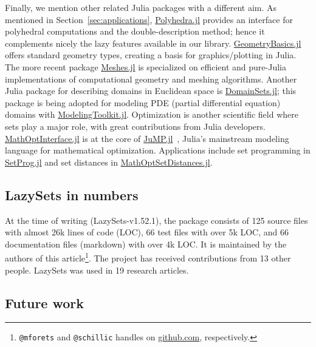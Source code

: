 Finally, we mention other related Julia packages with a different aim.
% 
As mentioned in Section~\ref{sec:applications}, \href{https://github.com/JuliaPolyhedra/Polyhedra.jl}{Polyhedra.jl} \cite{legat2021polyhedra} provides an interface for polyhedral computations and the double-description method; hence it complements nicely the lazy features available in our library.
%
\href{https://github.com/JuliaGeometry/GeometryBasics.jl}{GeometryBasics.jl} offers standard geometry types, creating a basis for graphics/plotting in Julia.
%
The more recent package
\href{https://github.com/JuliaGeometry/Meshes.jl}{Meshes.jl} is specialized on efficient and pure-Julia implementations of computational geometry and meshing algorithms.
%
Another Julia package for describing domains in Euclidean space is \href{https://github.com/JuliaApproximation/DomainSets.jl}{DomainSets.jl}; this package is being adopted for modeling PDE (partial differential equation) domains with \href{https://github.com/SciML/ModelingToolkit.jl}{ModelingToolkit.jl}.
%
Optimization is another scientific field where sets play a major role, with great contributions from Julia developers.
%
\href{https://github.com/jump-dev/MathOptInterface.jl}{MathOptInterface.jl}
\cite{legat2020mathoptinterface} is at the core of \href{https://github.com/jump-dev/JuMP.jl}{JuMP.jl}~\cite{DunningHuchetteLubin2017}, Julia's mainstream modeling language for mathematical optimization.
%
Applications include set programming in \href{https://github.com/blegat/SetProg.jl}{SetProg.jl}
and set distances in \href{https://github.com/jump-dev/MathOptSetDistances.jl}{MathOptSetDistances.jl}.

\subsection{LazySets in numbers}

At the time of writing (LazySets-v1.52.1), the package consists of 125 source files with almost 26k lines of code (LOC), 66 test files with over 5k LOC, and 66 documentation files (markdown) with over 4k LOC.
%
It is maintained by the authors of this article\footnote{\texttt{@mforets} and \texttt{@schillic} handles on \href{https://github.com/}{github.com}, respectively.}.
%
The project has received contributions from 13 other people.
%
LazySets was used in 19 research articles.


\subsection{Future work}

